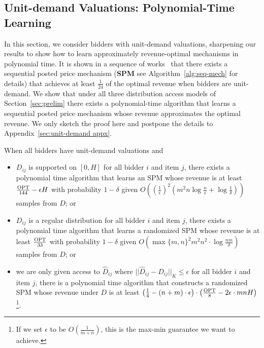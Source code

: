 \subsection{Unit-demand Valuations: Polynomial-Time Learning} \label{sec:unit-demand}

In this section, we consider bidders with unit-demand valuations, sharpening our results to show how to learn approximately revenue-optimal mechanisms in polynomial time. It is shown in a sequence of works~\cite{ChawlaHMS10, KleinbergW12, CaiDW16} that there exists a sequential posted price mechanism (\textbf{SPM} see Algorithm~\ref{alg:seq-mech} for details) that achieves at least $\frac{1}{24}$ of the optimal revenue when bidders are unit-demand. We show that under all three distribution access models of Section~\ref{sec:prelim} there exists a polynomial-time algorithm that learns a sequential posted price mechanism whose revenue approximates the optimal revenue. We only sketch the proof here and postpone the details to Appendix~\ref{sec:unit-demand appx}.

\begin{theorem}\label{thm:unit-demand}
	When all bidders have unit-demand valuations and \begin{itemize}
		\item $D_{ij}$ is supported on $[0,H]$ for all bidder $i$ and item $j$, there exists a polynomial time algorithm that learns an SPM whose revenue is at least $\frac{\text{OPT}}{144}-\epsilon H$ with probability $1-\delta$ given  $O\left(\left(\frac{1}{\epsilon}\right)^2 \left(m^2 n\log \frac{n}{\epsilon} + \log \frac{1}{\delta}\right)\right)$ samples from $D$; or
		\item $D_{ij}$ is a regular distribution for all bidder $i$ and item $j$, there exists a polynomial time algorithm that learns a randomized SPM whose revenue is at least $\frac{\text{OPT}}{33}$ with probability $1-\delta$ given $O(\max\{m,n\}^2m^2 n^2\cdot \log \frac{nm}{\delta})$ samples from $D$; or
		\item we are only given access to $\hat{D}_{ij}$ where $||\hat{D}_{ij}-D_{ij}||_K\leq \epsilon$ for all bidder $i$ and item $j$, there is a polynomial time algorithm that constructs a randomized SPM whose revenue under $D$ is at least $\left(\frac{1}{4}-(n+m)\cdot \epsilon\right)\cdot\left(\frac{\text{OPT}}{8}-2\epsilon\cdot mnH\right)$\footnote{If we set $\epsilon$ to be $O(\frac{1}{m+n})$, this is the max-min guarantee we want to achieve.}.
	\end{itemize}
\end{theorem}

